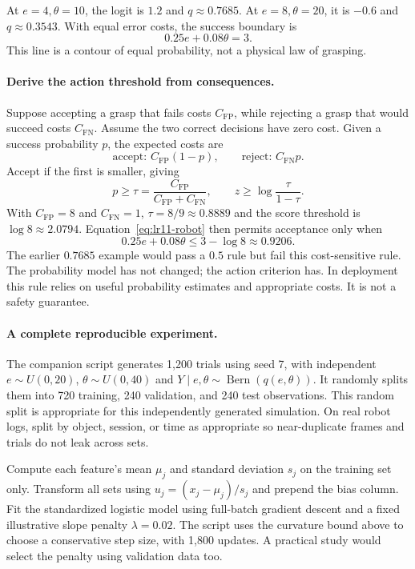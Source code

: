 At $e=4,\theta=10$, the logit is $1.2$ and $q\approx0.7685$. At
$e=8,\theta=20$, it is $-0.6$ and $q\approx0.3543$. With equal error costs, the
success boundary is
\[
0.25e+0.08\theta=3.
\]
This line is a contour of equal probability, not a physical law of grasping.

\paragraph{Derive the action threshold from consequences.}
Suppose accepting a grasp that fails costs $C_{\mathrm{FP}}$, while rejecting a
grasp that would succeed costs $C_{\mathrm{FN}}$. Assume the two correct decisions
have zero cost. Given a success probability $p$, the expected costs are
\[
\text{accept: }C_{\mathrm{FP}}(1-p),\qquad
\text{reject: }C_{\mathrm{FN}}p.
\]
Accept if the first is smaller, giving
\begin{equation}
p\geq\tau=\frac{C_{\mathrm{FP}}}{C_{\mathrm{FP}}+C_{\mathrm{FN}}},\qquad
z\geq\log\frac{\tau}{1-\tau}.
\label{eq:lr11-cost}
\end{equation}
With $C_{\mathrm{FP}}=8$ and $C_{\mathrm{FN}}=1$, $\tau=8/9\approx0.8889$
and the score threshold is $\log8\approx2.0794$. Equation~\eqref{eq:lr11-robot}
then permits acceptance only when
\[
0.25e+0.08\theta\leq3-\log8\approx0.9206.
\]
The earlier $0.7685$ example would pass a $0.5$ rule but fail this cost-sensitive
rule. The probability model has not changed; the action criterion has.
In deployment this rule relies on useful probability estimates and appropriate
costs. It is not a safety guarantee.

\paragraph{A complete reproducible experiment.}
The companion script generates 1,200 trials using seed 7, with independent
$e\sim U(0,20)$, $\theta\sim U(0,40)$ and
$Y\mid e,\theta\sim\operatorname{Bern}(q(e,\theta))$. It randomly splits them
into 720 training, 240 validation, and 240 test observations. This random split
is appropriate for this independently generated simulation. On real robot
logs, split by object, session, or time as appropriate so near-duplicate frames
and trials do not leak across sets.

Compute each feature's mean $\mu_j$ and standard deviation $s_j$ on the training
set only. Transform all sets using $u_j=(x_j-\mu_j)/s_j$ and prepend the bias
column. Fit the standardized logistic model using full-batch gradient descent
and a fixed illustrative slope penalty $\lambda=0.02$. The script uses the
curvature bound above to choose a conservative step size, with 1,800 updates.
A practical study would select the penalty using validation data too.


